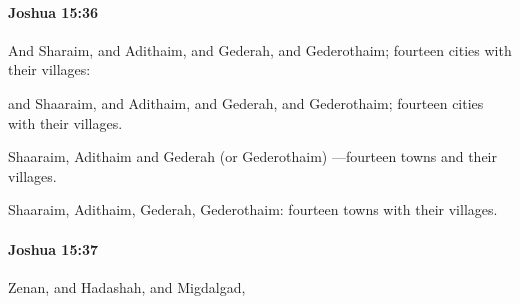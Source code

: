 		\paragraph{Joshua 15:36} %
			\label{JOSHUA-15-36}

			And Sharaim, and Adithaim, and Gederah, and Gederothaim; fourteen cities with their villages:

			\begin{versebox}
					\item[BHS] 
					\item[ASV] and Shaaraim, and Adithaim, and Gederah, and Gederothaim; fourteen cities with their villages.
					\item[NIV] Shaaraim, Adithaim and Gederah (or Gederothaim) —fourteen towns and their villages.
					\item[NRSV] Shaaraim, Adithaim, Gederah, Gederothaim: fourteen towns with their villages.
			\end{versebox}

		\paragraph{Joshua 15:37} %
			\label{JOSHUA-15-37}

			Zenan, and Hadashah, and Migdalgad,

